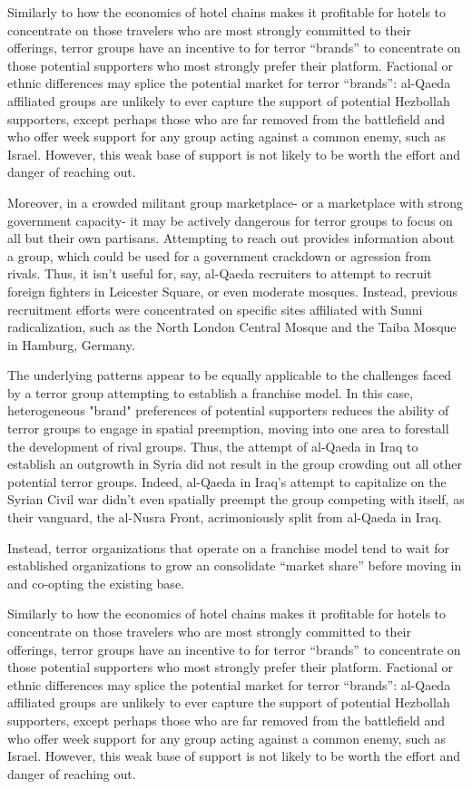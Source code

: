 \documentclass{article}
\begin{document}
Similarly to how the economics of hotel chains makes it profitable for
hotels to concentrate on those travelers who are most strongly
committed to their offerings, terror groups have an incentive to for
terror ``brands'' to concentrate on those potential supporters who
most strongly prefer their platform. Factional or ethnic differences
may splice the potential market for terror ``brands'': al-Qaeda
affiliated groups are unlikely to ever capture the support of
potential Hezbollah supporters, except perhaps those who are far
removed from the battlefield and who offer week support for any group
acting against a common enemy, such as Israel. However, this weak base
of support is not likely to be worth the effort and danger of reaching
out. 

Moreover, in a crowded militant group marketplace- or a marketplace
with strong government capacity- it may be actively
dangerous for terror groups to focus on all but their own
partisans. Attempting to reach out provides information about a group,
which could be used for a government crackdown or  agression from
rivals. Thus, it isn't useful for, say, al-Qaeda recruiters to attempt to recruit
foreign fighters in Leicester Square, or even moderate mosques.
Instead, previous recruitment efforts were concentrated on specific
sites affiliated with Sunni radicalization, such as the North
London Central Mosque and the Taiba Mosque in Hamburg, Germany.

The underlying patterns appear to be equally applicable to the
challenges faced by a terror group attempting to establish a franchise
model. In this case, heterogeneous "brand" preferences of potential supporters
reduces the ability of terror groups to engage in spatial preemption,
moving into one area to forestall the development of rival
groups. Thus, the attempt of al-Qaeda in Iraq to establish an
outgrowth in Syria did not result in the group crowding out all other
potential terror groups. Indeed, al-Qaeda in Iraq's attempt to
capitalize on the Syrian Civil war didn't even spatially preempt the
group competing with itself, as their vanguard, the al-Nusra Front,
acrimoniously split from al-Qaeda in Iraq.

 Instead, terror organizations that operate on a franchise model tend
 to wait for established organizations to grow an consolidate ``market
 share'' before moving in and co-opting the existing base.

Similarly to how the economics of hotel chains makes it profitable for
hotels to concentrate on those travelers who are most strongly
committed to their offerings, terror groups have an incentive to for
terror ``brands'' to concentrate on those potential supporters who
most strongly prefer their platform. Factional or ethnic differences
may splice the potential market for terror ``brands'': al-Qaeda
affiliated groups are unlikely to ever capture the support of
potential Hezbollah supporters, except perhaps those who are far
removed from the battlefield and who offer week support for any group
acting against a common enemy, such as Israel. However, this weak base
of support is not likely to be worth the effort and danger of reaching
out. 
\end{document}
